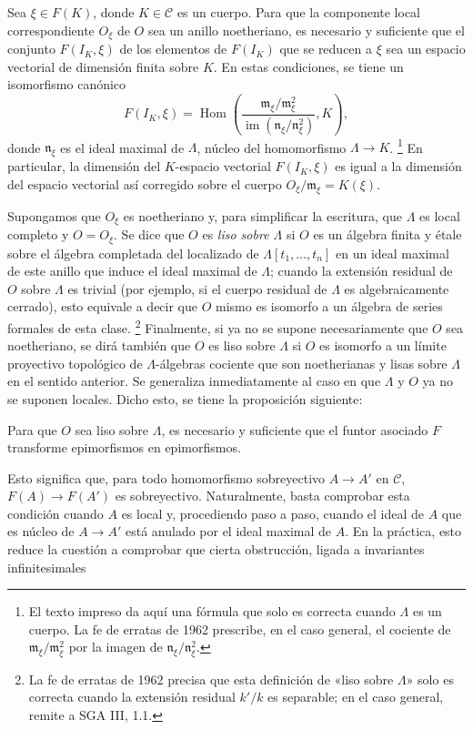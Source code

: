  Sea $\xi\in F(K)$, donde $K\in\mathcal C$ es un
cuerpo. Para que la componente local correspondiente $O_\xi$ de $O$ sea un
anillo noetheriano, es necesario y suficiente que el conjunto $F(I_K,\xi)$ de
los elementos de $F(I_K)$ que se reducen a $\xi$ sea un espacio vectorial
de dimensión finita sobre $K$. En estas condiciones, se tiene un isomorfismo
canónico
\[
  F(I_K,\xi)=
  \operatorname{Hom}\!\left(
    \frac{\mathfrak m_\xi/\mathfrak m_\xi^2}
         {\operatorname{im}(\mathfrak n_\xi/\mathfrak n_\xi^2)},K
  \right),
\]
donde $\mathfrak n_\xi$ es el ideal maximal de $\Lambda$, núcleo del
homomorfismo $\Lambda\longrightarrow K$.
\footnote{El texto impreso da aquí una fórmula que solo es correcta cuando
$\Lambda$ es un cuerpo. La fe de erratas de 1962 prescribe, en el caso general,
el cociente de $\mathfrak m_\xi/\mathfrak m_\xi^2$ por la imagen de
$\mathfrak n_\xi/\mathfrak n_\xi^2$.}
En particular, la dimensión del $K$-espacio vectorial $F(I_K,\xi)$ es igual a
la dimensión del espacio vectorial así corregido sobre el cuerpo
$O_\xi/\mathfrak m_\xi=K(\xi)$.

Supongamos que $O_\xi$ es noetheriano y, para simplificar la escritura, que
$\Lambda$ es local completo y $O=O_\xi$. Se dice que $O$ es \emph{liso sobre
$\Lambda$} si $O$ es un álgebra finita y étale sobre el álgebra completada del
localizado de $\Lambda[t_1,\ldots,t_n]$ en un ideal maximal de este anillo que
induce el ideal maximal de $\Lambda$; cuando la extensión residual de $O$ sobre
$\Lambda$ es trivial (por ejemplo, si el cuerpo residual de $\Lambda$ es
algebraicamente cerrado), esto equivale a decir que $O$ mismo es isomorfo a un
álgebra de series formales de esta clase.
\footnote{La fe de erratas de 1962 precisa que esta definición de «liso sobre
$\Lambda$» solo es correcta cuando la extensión residual $k'/k$ es separable;
en el caso general, remite a SGA III, 1.1.}
Finalmente, si ya no se supone necesariamente que $O$ sea noetheriano, se dirá
también que $O$ es liso sobre $\Lambda$ si $O$ es isomorfo a un límite
proyectivo topológico de $\Lambda$-álgebras cociente que son noetherianas y
lisas sobre $\Lambda$ en el sentido anterior. Se generaliza inmediatamente al caso
en que $\Lambda$ y $O$ ya no se suponen locales. Dicho esto, se tiene la
proposición siguiente:

 Para que $O$ sea liso sobre $\Lambda$, es necesario
y suficiente que el funtor asociado $F$ transforme epimorfismos en
epimorfismos.

Esto significa que, para todo homomorfismo sobreyectivo
$A\longrightarrow A'$ en $\mathcal C$, $F(A)\longrightarrow F(A')$ es
sobreyectivo. Naturalmente, basta comprobar esta condición cuando $A$ es local
y, procediendo paso a paso, cuando el ideal de $A$ que es núcleo de
$A\longrightarrow A'$ está anulado por el ideal maximal de $A$. En la práctica,
esto reduce la cuestión a comprobar que cierta obstrucción, ligada a invariantes
infinitesimales

